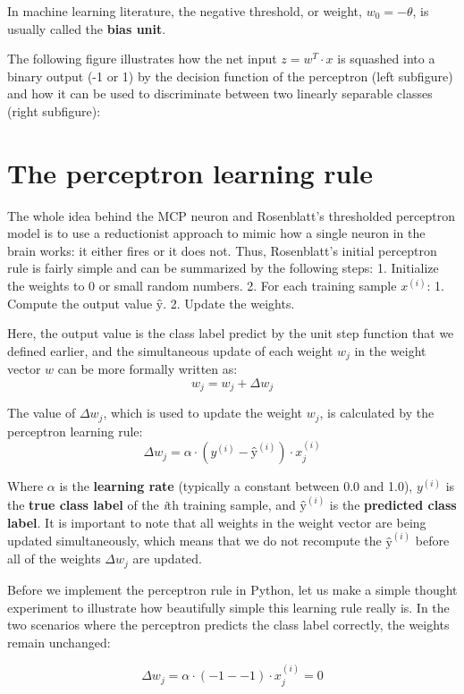 \documentclass[11pt]{article}
\begin{document}
    In machine learning literature, the negative threshold, or weight,
\(w_0 = -\theta\), is usually called the \textbf{bias unit}.

    The following figure illustrates how the net input \(z = w^T \cdot x\)
is squashed into a binary output (-1 or 1) by the decision function of
the perceptron (left subfigure) and how it can be used to discriminate
between two linearly separable classes (right subfigure):

    \section{The perceptron learning
rule}\label{the-perceptron-learning-rule}

    The whole idea behind the MCP neuron and Rosenblatt's thresholded
perceptron model is to use a reductionist approach to mimic how a single
neuron in the brain works: it either fires or it does not. Thus,
Rosenblatt's initial perceptron rule is fairly simple and can be
summarized by the following steps: 1. Initialize the weights to 0 or
small random numbers. 2. For each training sample \(x^{(i)}\): 1.
Compute the output value \(ŷ\). 2. Update the weights.

    Here, the output value is the class label predict by the unit step
function that we defined earlier, and the simultaneous update of each
weight \(w_j\) in the weight vector \(w\) can be more formally written
as: \[w_j = w_j + \Delta w_j\]

    The value of \(\Delta w_j\), which is used to update the weight \(w_j\),
is calculated by the perceptron learning rule:
\[\Delta w_j = \alpha \cdot (y^{(i)} - ŷ^{(i)}) \cdot x^{(i)}_j\]

Where \(\alpha\) is the \textbf{learning rate} (typically a constant
between 0.0 and 1.0), \(y^{(i)}\) is the \textbf{true class label} of
the \emph{i}th training sample, and \(ŷ^{(i)}\) is the \textbf{predicted
class label}. It is important to note that all weights in the weight
vector are being updated simultaneously, which means that we do not
recompute the \(ŷ^{(i)}\) before all of the weights \(\Delta w_j\) are
updated.

    Before we implement the perceptron rule in Python, let us make a simple
thought experiment to illustrate how beautifully simple this learning
rule really is. In the two scenarios where the perceptron predicts the
class label correctly, the weights remain unchanged:

\[\Delta w_j = \alpha \cdot (-1--1) \cdot x^{(i)}_j = 0\]
\end{document}
